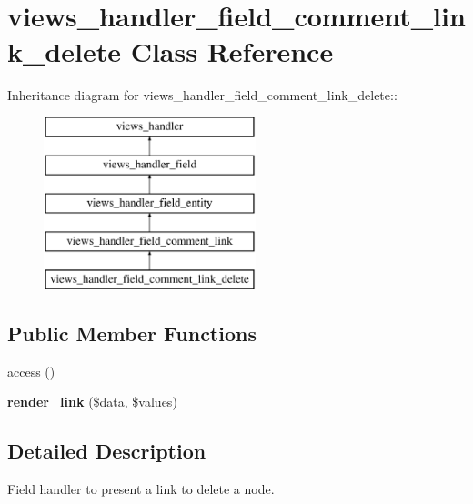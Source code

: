 \hypertarget{classviews__handler__field__comment__link__delete}{
\section{views\_\-handler\_\-field\_\-comment\_\-link\_\-delete Class Reference}
\label{classviews__handler__field__comment__link__delete}
}
Inheritance diagram for views\_\-handler\_\-field\_\-comment\_\-link\_\-delete::\begin{figure}[H]
\begin{center}
\leavevmode
\includegraphics[height=5cm]{classviews__handler__field__comment__link__delete}
\end{center}
\end{figure}
\subsection*{Public Member Functions}
\begin{DoxyCompactItemize}
\item 
\hyperlink{classviews__handler__field__comment__link__delete_ad37af388e723047cc0f727d471ca6efb}{access} ()
\item 
\hypertarget{classviews__handler__field__comment__link__delete_a07ed8ae200d4913c4b83a07898b99acf}{
{\bfseries render\_\-link} (\$data, \$values)}
\label{classviews__handler__field__comment__link__delete_a07ed8ae200d4913c4b83a07898b99acf}

\end{DoxyCompactItemize}


\subsection{Detailed Description}
Field handler to present a link to delete a node. 

